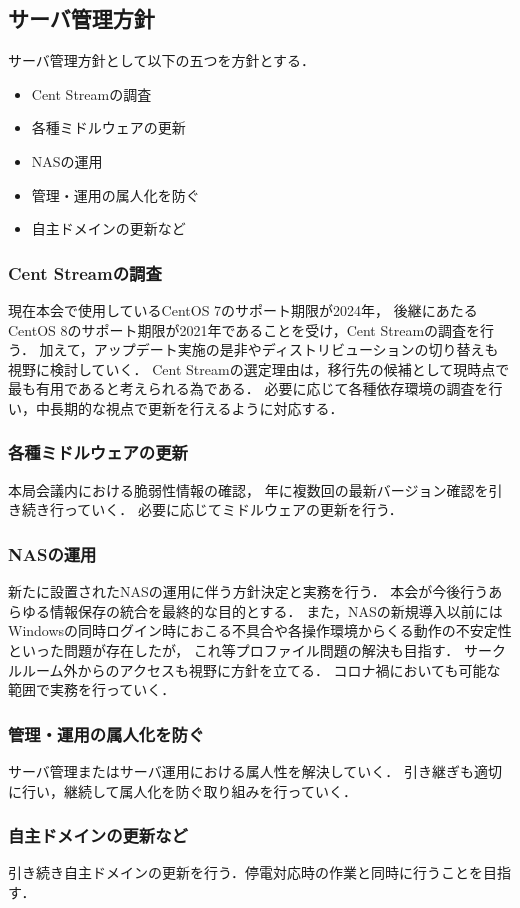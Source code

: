 \subsection*{サーバ管理方針}


サーバ管理方針として以下の五つを方針とする．
\begin{itemize}
    \item Cent Streamの調査
    \item 各種ミドルウェアの更新
    \item NASの運用
    \item 管理・運用の属人化を防ぐ
    \item 自主ドメインの更新など
\end{itemize}

\subsubsection*{Cent Streamの調査}
現在本会で使用しているCentOS 7のサポート期限が2024年，
後継にあたるCentOS 8のサポート期限が2021年であることを受け，Cent Streamの調査を行う．
加えて，アップデート実施の是非やディストリビューションの切り替えも視野に検討していく．
Cent Streamの選定理由は，移行先の候補として現時点で最も有用であると考えられる為である．
必要に応じて各種依存環境の調査を行い，中長期的な視点で更新を行えるように対応する．

\subsubsection*{各種ミドルウェアの更新}
本局会議内における脆弱性情報の確認，
年に複数回の最新バージョン確認を引き続き行っていく．
必要に応じてミドルウェアの更新を行う．

\subsubsection*{NASの運用}
新たに設置されたNASの運用に伴う方針決定と実務を行う．
本会が今後行うあらゆる情報保存の統合を最終的な目的とする．
また，NASの新規導入以前にはWindowsの同時ログイン時におこる不具合や各操作環境からくる動作の不安定性といった問題が存在したが，
これ等プロファイル問題の解決も目指す．
サークルルーム外からのアクセスも視野に方針を立てる．
コロナ禍においても可能な範囲で実務を行っていく．

\subsubsection*{管理・運用の属人化を防ぐ}
サーバ管理またはサーバ運用における属人性を解決していく．
引き継ぎも適切に行い，継続して属人化を防ぐ取り組みを行っていく．

\subsubsection*{自主ドメインの更新など}
引き続き自主ドメインの更新を行う．停電対応時の作業と同時に行うことを目指す．
